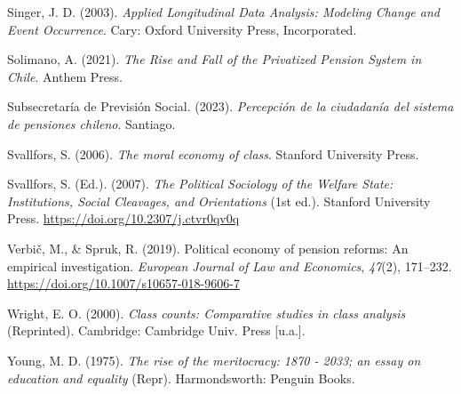 \documentclass[
  12pt,
]{article}
\newlength{\cslhangindent}
\newenvironment{CSLReferences}[2] %
 {\begin{list}{}{%
  \setlength{\itemindent}{0pt}
  \setlength{\leftmargin}{0pt}
  \setlength{\parsep}{0pt}
  \ifodd #1
   \setlength{\leftmargin}{\cslhangindent}
   \setlength{\itemindent}{-1\cslhangindent}
  \fi
  \setlength{\itemsep}{#2\baselineskip}}}
 {\end{list}}
\begin{document}
\begin{CSLReferences}{1}{0}
Singer, J. D. (2003). \emph{Applied {Longitudinal Data Analysis}:
{Modeling Change} and {Event Occurrence}}. Cary: Oxford University
Press, Incorporated.

Solimano, A. (2021). \emph{The {Rise} and {Fall} of the {Privatized
Pension System} in {Chile}}. Anthem Press.

Subsecretaría de Previsión Social. (2023). \emph{Percepción de la
ciudadanía del sistema de pensiones chileno}. Santiago.

Svallfors, S. (2006). \emph{The moral economy of class}. Stanford
University Press.

Svallfors, S. (Ed.). (2007). \emph{The {Political Sociology} of the
{Welfare State}: {Institutions}, {Social Cleavages}, and {Orientations}}
(1st ed.). Stanford University Press.
\url{https://doi.org/10.2307/j.ctvr0qv0q}

Verbič, M., \& Spruk, R. (2019). Political economy of pension reforms:
An empirical investigation. \emph{European Journal of Law and
Economics}, \emph{47}(2), 171--232.
\url{https://doi.org/10.1007/s10657-018-9606-7}

Wright, E. O. (2000). \emph{Class counts: Comparative studies in class
analysis} (Reprinted). Cambridge: Cambridge Univ. Press {[}u.a.{]}.

Young, M. D. (1975). \emph{The rise of the meritocracy: 1870 - 2033; an
essay on education and equality} (Repr). Harmondsworth: Penguin Books.

\end{CSLReferences}
\end{document}
